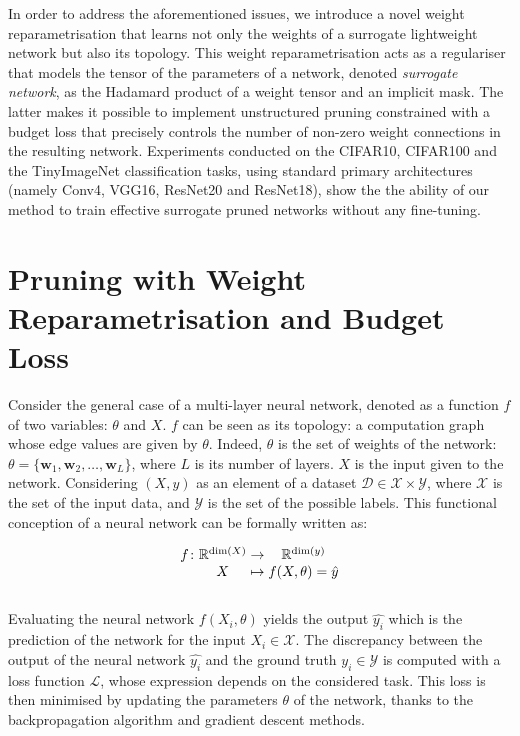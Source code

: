 In order to address the aforementioned issues, we introduce a novel weight
reparametrisation that learns not only the weights of a surrogate lightweight
network but also its topology. This weight reparametrisation acts as a
regulariser that models the tensor of the parameters of a network, denoted
\textit{surrogate network}, as the Hadamard product of a weight tensor and an
implicit mask. The latter makes it possible to implement unstructured pruning
constrained with a budget loss that precisely controls the number of non-zero
weight connections in the resulting network. Experiments conducted on the
CIFAR10, CIFAR100 and the TinyImageNet classification tasks, using standard
primary architectures (namely Conv4, VGG16, ResNet20 and ResNet18), show the the
ability of our method to train effective surrogate pruned networks without any
fine-tuning.


\section{Pruning with Weight Reparametrisation and Budget Loss}
Consider the general case of a multi-layer neural network, denoted as a function
$f$ of two variables: $\theta$ and $X$. $f$ can be seen as its topology: a
computation graph whose edge values are given by $\theta$. Indeed, $\theta$ is
the set of weights of the network: $\theta = \{\mathbf{w}_1, \mathbf{w}_2,
\ldots, \mathbf{w}_L\}$, where $L$ is its number of layers. $X$ is
the input given to the network. Considering $(X,y)$ as an element of a dataset
$\mathcal{D} \in \mathcal{X} \times \mathcal{Y}$, where $\mathcal{X}$ is the set
of the input data, and $\mathcal{Y}$ is the set of the possible labels. This
functional conception of a neural network can be formally written as:

\begin{equation}
    \begingroup
  \setlength\arraycolsep{0pt}
  f \colon\begin{array}[t]{c >{{}}c<{{}} c}
             \mathbb{R}^{\dim (X)} & \to & \mathbb{R}^{\dim (y)} \\ 
             X & \mapsto & f(X, \theta) = \hat{y} 
          \end{array}
  \endgroup
\end{equation}\\

Evaluating the neural network $f(X_i, \theta)$ yields the output $\hat{y_i}$
which is the prediction of the network for the input $X_i\in\mathcal{X}$. The
discrepancy between the output of the neural network $\hat{y_i}$ and the ground
truth $y_i \in \mathcal{Y}$ is computed with a loss function $\mathcal{L}$,
whose expression depends on the considered task. This loss is then minimised by
updating the parameters $\theta$ of the network, thanks to the backpropagation
algorithm \cite{rumelhart1985learning,rumelhart1986learning} and gradient
descent methods.\\

